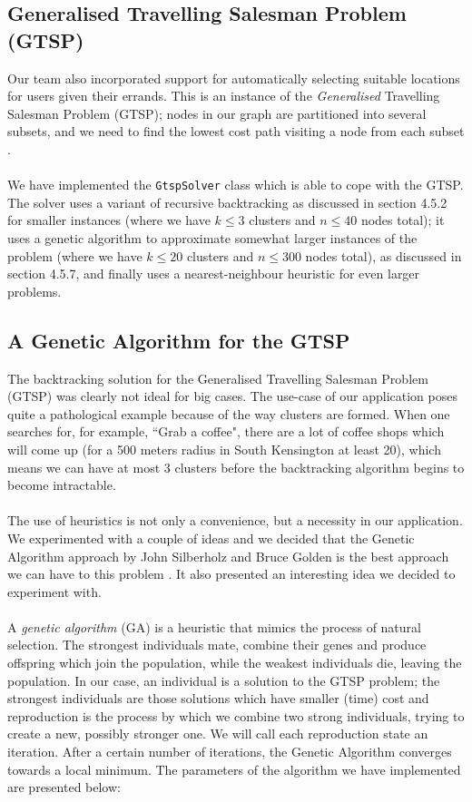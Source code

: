 \documentclass[a4paper, 10pt]{report}
\begin{document}
\subsection{Generalised Travelling Salesman Problem (GTSP)}
Our team also incorporated support for automatically selecting suitable locations for users given their errands. This is an instance of the \textit{Generalised} Travelling Salesman Problem (GTSP); nodes in our graph are partitioned into several subsets, and we need to find the lowest cost path visiting a node from each subset \cite{gtsp-transform}.
\\\\
We have implemented the \texttt{GtspSolver} class which is able to cope with the GTSP. The solver uses a variant of recursive backtracking as discussed in section 4.5.2 for smaller instances (where we have $k \leq 3$ clusters and $n \leq 40$ nodes total); it uses a genetic algorithm \cite{gtsp-ga} to approximate somewhat larger instances of the problem (where we have $k \leq 20$ clusters and $n \leq 300$ nodes total), as discussed in section 4.5.7, and finally uses a nearest-neighbour heuristic for even larger problems.
\subsection{A Genetic Algorithm for the GTSP}
The backtracking solution for the Generalised Travelling Salesman Problem (GTSP) was clearly not ideal for big cases. The use-case of our application poses quite a pathological example because of the way clusters are formed. When one searches for, for example, ``Grab a coffee", there are a lot of coffee shops which will come up (for a 500 meters radius in South Kensington at least 20), which means we can have at most 3 clusters before the backtracking algorithm begins to become intractable.
\\\\
The use of heuristics is not only a convenience, but a necessity in our application. We experimented with a couple of ideas and we decided that the Genetic Algorithm approach by John Silberholz and Bruce Golden is the best approach we can have to this problem \cite{gtsp-ga}. It also presented an interesting idea we decided to experiment with.
\\\\
A \textit{genetic algorithm} (GA) is a heuristic that mimics the process of natural selection. The strongest individuals mate, combine their genes and produce offspring which join the population, while the weakest individuals die, leaving the population. In our case, an individual is a solution to the GTSP problem; the strongest individuals are those solutions which have smaller (time) cost and reproduction is the process by which we combine two strong individuals, trying to create a new, possibly stronger one. We will call each reproduction state an iteration. After a certain number of iterations, the Genetic Algorithm converges towards a local minimum. The parameters of the algorithm we have implemented are presented below:
\end{document}
